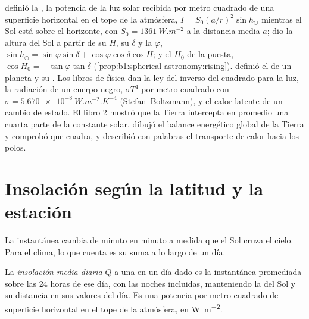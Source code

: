\begin{recall}
 definió la , la potencia de la luz solar recibida por metro cuadrado de una superficie horizontal en el tope de la atmósfera, $I = S_0(a/r)^2\sin h_\odot$ mientras el Sol está sobre el horizonte, con $S_0 = \qty{1361}{W.m^{-2}}$
a la distancia media $a$; dio la altura del Sol a partir de su  $H$, su  $\delta$ y la  $\varphi$,
$\sin h_\odot = \sin\varphi\sin\delta + \cos\varphi\cos\delta\cos H$; y el  $H_0$ de la puesta, $\cos H_0 = -\tan\varphi\tan\delta$
(\cref{prop:b1:spherical-astronomy:rising}).  definió el  de un planeta y su . Los libros de física dan la ley del inverso del cuadrado para la luz, la radiación de un cuerpo negro,
$\sigma T^4$ por metro cuadrado con $\sigma = \qty{5.670e-8}{W.m^{-2}.K^{-4}}$
(Stefan--Boltzmann), y el calor latente de un cambio de estado. El libro 2 mostró que la Tierra intercepta en promedio una cuarta parte de la constante solar, dibujó el balance energético global de la Tierra y comprobó que cuadra, y describió con palabras el transporte de calor hacia los polos.
\end{recall}

\section{Insolación según la latitud y la estación}\label{sec:b1:radiation-heat-transport:insolation}

La  instantánea cambia de minuto en minuto a medida que el Sol cruza el cielo. Para el clima, lo que cuenta es su suma a lo largo de un día.

\begin{definition}\label{def:b1:radiation-heat-transport:daily-insolation}
La \emph{insolación media diaria} $\bar Q$ a una  en un día dado es la  instantánea promediada sobre las 24 horas de ese día, con las noches incluidas, manteniendo la  del Sol y su distancia en sus valores del día. Es una potencia por metro cuadrado de superficie horizontal en el tope de la atmósfera, en \unit{W.m^{-2}}.
\end{definition}

